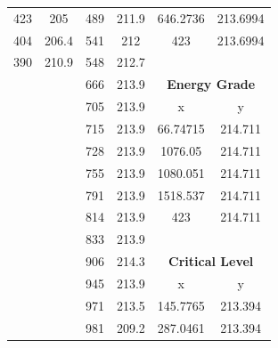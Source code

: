 \begin{center}
\begin{tabular}{|cc||cc||cc|}
    423      & 205                       & 489  & 211.9                          & 646.2736 & 213.6994                            \\
    404      & 206.4                     & 541  & 212                            & 423      & 213.6994                            \\
    390      & 210.9                     & 548  & 212.7                          &          &                                     \\
             &                           & 666  & 213.9                          & \multicolumn{2}{c|}{\textbf{Energy Grade }}    \\ 
    \cline{5-6}
             &                           & 705  & 213.9                          & x        & y                                   \\
             &                           & 715  & 213.9                          & 66.74715 & 214.711                             \\
             &                           & 728  & 213.9                          & 1076.05  & 214.711                             \\
             &                           & 755  & 213.9                          & 1080.051 & 214.711                             \\
             &                           & 791  & 213.9                          & 1518.537 & 214.711                             \\
             &                           & 814  & 213.9                          & 423      & 214.711                             \\
             &                           & 833  & 213.9                          &          &                                     \\
             &                           & 906  & 214.3                          & \multicolumn{2}{c|}{\textbf{Critical Level }}  \\ 
    \cline{5-6}
             &                           & 945  & 213.9                          & x        & y                                   \\
             &                           & 971  & 213.5                          & 145.7765 & 213.394                             \\
             &                           & 981  & 209.2                          & 287.0461 & 213.394                             \\

\end{tabular}
\end{center}
